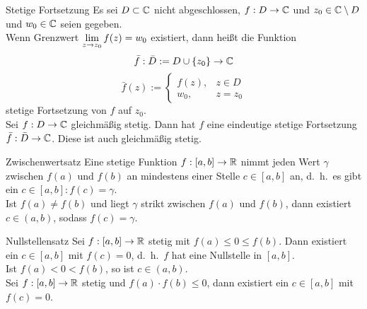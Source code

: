 \documentclass[main.tex]{subfiles}
\begin{document}
\begin{karte}{Stetige Fortsetzung}
    Es sei \( D \subset \mathbb{C} \) nicht abgeschlossen, 
    \( f: D\rightarrow \mathbb{C} \) und \( z_0 \in \mathbb{C}
    \setminus D \) und \( w_0 \in \mathbb{C} \) seien gegeben.\\
    Wenn Grenzwert \( \lim\limits_{z\rightarrow z_0} f(z) = w_0 \)
    existiert, dann heißt die Funktion 
    \[ \bar{f} : \bar{D} := D \cup \{z_0\} 
    \rightarrow \mathbb{C} \]
    \[ \bar{f}(z) := 
    \begin{cases}
        f(z), &z\in D \\
        w_0, &z = z_0
    \end{cases} \]
    stetige Fortsetzung von \(f\) auf \(z_0\). \\

    Sei \( f: D\rightarrow \mathbb{C} \) gleichmäßig stetig. 
    Dann hat \(f\) eine eindeutige stetige Fortsetzung 
    \( \bar{f} : \bar{D} \rightarrow \mathbb{C} \). Diese ist 
    auch gleichmäßig stetig.
\end{karte}
\begin{karte}{Zwischenwertsatz}
    Eine stetige Funktion \( f: [a,b] \rightarrow \mathbb{R} \) 
    nimmt jeden Wert \( \gamma \) zwischen \( f(a) \) 
    und \( f(b) \) an mindestens einer Stelle 
    \( c\in [a,b] \) an, d.\ h.\ es gibt ein 
    \( c \in [a,b] : f(c) = \gamma \). \\
    Ist \( f(a) \neq f(b) \) und liegt \( \gamma \) strikt 
    zwischen \( f(a) \) und \( f(b) \), dann existiert 
    \( c \in (a,b) \), sodass \( f(c) = \gamma \).
\end{karte}
\begin{karte}{Nullstellensatz}
    Sei \( f : [a,b] \rightarrow \mathbb{R} \) stetig 
    mit \( f(a) \leq 0 \leq f(b) \). Dann existiert 
    ein \( c \in [a,b] \) mit \(f(c) = 0\), d.\ h.\ 
    \(f\) hat eine Nullstelle in \( [a,b] \).\\
    Ist \( f(a) < 0 < f(b) \), so ist \( c \in (a,b) \). \\
    Sei \( f: [a,b] \rightarrow \mathbb{R} \) stetig und 
    \( f(a) \cdot f(b) \leq 0 \), dann existiert 
    ein \( c \in [a,b] \) mit \( f(c) = 0 \).
\end{karte}
\end{document}
